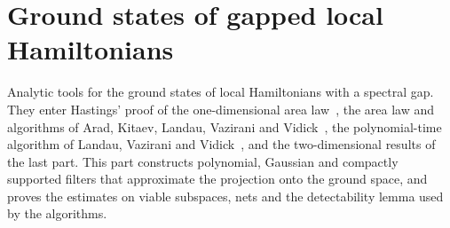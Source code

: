 \part{Ground states of gapped local Hamiltonians}
\label{part:gapped_ground_states}

Analytic tools for the ground states of local Hamiltonians with a spectral gap.
They enter Hastings' proof of the one-dimensional area
law~\cite{Hastings2007AreaLaw}, the area law and algorithms of Arad, Kitaev,
Landau, Vazirani and Vidick~\cite{Arad2013AreaLaw,Arad2016RigorousRG}, the
polynomial-time algorithm of Landau, Vazirani and
Vidick~\cite{Landau2013PolynomialTime}, and the two-dimensional results of the
last part. This part constructs polynomial, Gaussian and compactly supported
filters that approximate the projection onto the ground space, and proves the
estimates on viable subspaces, nets and the detectability lemma used by the
algorithms.
